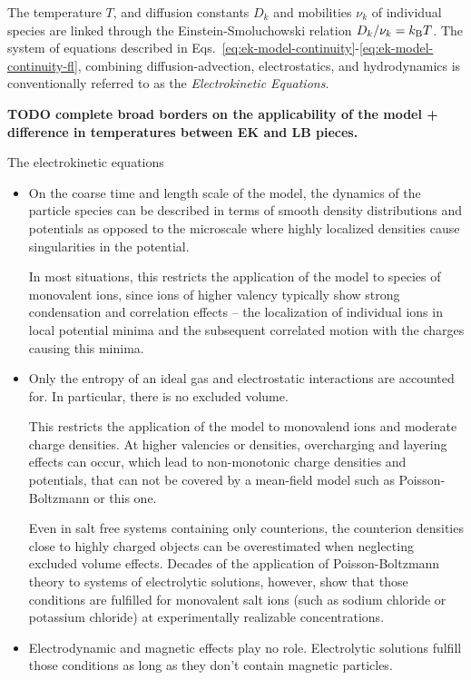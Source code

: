 The temperature $T$, and diffusion constants $D_k$ and mobilities $\nu_k$ of
individual species are linked through the Einstein-Smoluchowski relation $D_k /
\nu_k = k_\mathrm{B}T$. The system of equations described in
Eqs.~\eqref{eq:ek-model-continuity}-\eqref{eq:ek-model-continuity-fl}, combining 
diffusion-advection, electrostatics, and hydrodynamics is conventionally 
referred to as the \textit{Electrokinetic Equations}.

\textbf{TODO complete broad borders on the applicability of the model + difference in temperatures between EK and LB pieces.}

The electrokinetic equations 

\begin{itemize}
	\item On the coarse time and length scale of the model, the dynamics of the
	particle species can be described in terms of smooth density distributions and
	potentials as opposed to the microscale where highly localized densities cause
	singularities in the potential.
	
	In most situations, this restricts the application of the model to species of
	monovalent ions, since ions of higher valency typically show strong
	condensation and correlation effects -- the localization of individual ions in
	local potential minima and the subsequent correlated motion with the charges
	causing this minima.
	
	\item Only the entropy of an ideal gas and electrostatic interactions are
	accounted for. In particular, there is no excluded volume.
	
	This restricts the application of the model to monovalend ions and moderate
  charge densities. At higher valencies or densities, overcharging and layering
  effects can occur, which lead to non-monotonic charge densities and potentials,
  that can not be covered by a mean-field model such as Poisson-Boltzmann or this
  one.
	
	Even in salt free systems containing only counterions, the counterion
	densities close to highly charged objects can be overestimated when neglecting
	excluded volume effects. Decades of the application of Poisson-Boltzmann
	theory to systems of electrolytic solutions, however, show that those
	conditions are fulfilled for monovalent salt ions (such as sodium chloride or
	potassium chloride) at experimentally realizable concentrations.
	
	\item Electrodynamic and magnetic effects play no role. Electrolytic solutions
	fulfill those conditions as long as they don't contain magnetic particles.
	

\end{itemize}

